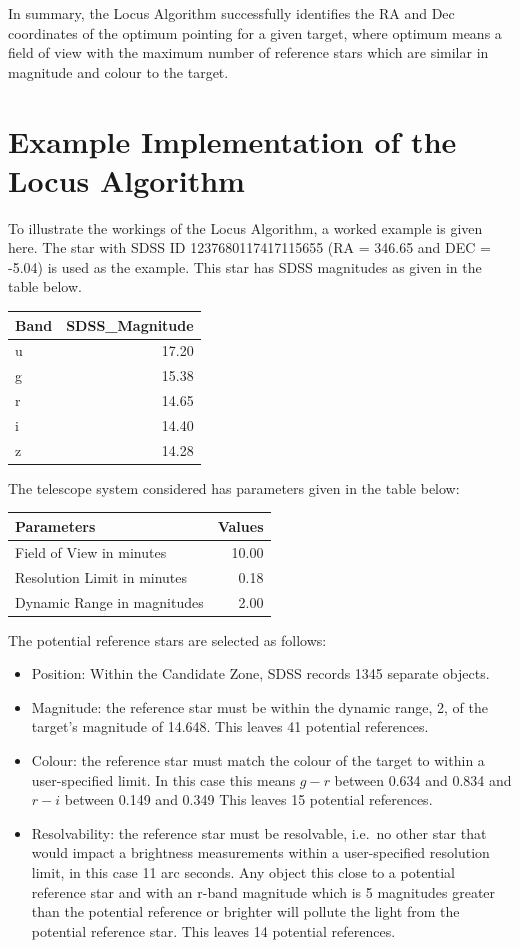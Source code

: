 \documentclass[]{elsarticle} %
\providecommand{\tightlist}{%
  \setlength{\itemsep}{0pt}\setlength{\parskip}{0pt}}
\begin{document}
In summary, the Locus Algorithm successfully identifies the RA and Dec
coordinates of the optimum pointing for a given target, where optimum
means a field of view with the maximum number of reference stars which
are similar in magnitude and colour to the target.

\newpage

\hypertarget{example-implementation-of-the-locus-algorithm}{%
\section{Example Implementation of the Locus
Algorithm}\label{example-implementation-of-the-locus-algorithm}}

To illustrate the workings of the Locus Algorithm, a worked example is
given here. The star with SDSS ID 1237680117417115655 (RA = 346.65 and
DEC = -5.04) is used as the example. This star has SDSS magnitudes as
given in the table below.

\begin{longtable}[]{@{}lr@{}}
\toprule
Band & SDSS\_Magnitude\tabularnewline
\midrule
\endhead
u & 17.20\tabularnewline
g & 15.38\tabularnewline
r & 14.65\tabularnewline
i & 14.40\tabularnewline
z & 14.28\tabularnewline
\bottomrule
\end{longtable}

The telescope system considered has parameters given in the table below:

\begin{longtable}[]{@{}lr@{}}
\toprule
Parameters & Values\tabularnewline
\midrule
\endhead
Field of View in minutes & 10.00\tabularnewline
Resolution Limit in minutes & 0.18\tabularnewline
Dynamic Range in magnitudes & 2.00\tabularnewline
\bottomrule
\end{longtable}

The potential reference stars are selected as follows:

\begin{itemize}
\tightlist
\item
  Position: Within the Candidate Zone, SDSS records 1345 separate
  objects.
\item
  Magnitude: the reference star must be within the dynamic range, 2, of
  the target's magnitude of 14.648. This leaves 41 potential references.
\item
  Colour: the reference star must match the colour of the target to
  within a user-specified limit. In this case this means \(g - r\)
  between 0.634 and 0.834 and \(r - i\) between 0.149 and 0.349 This
  leaves 15 potential references.
\item
  Resolvability: the reference star must be resolvable, i.e.~no other
  star that would impact a brightness measurements within a
  user-specified resolution limit, in this case 11 arc seconds. Any
  object this close to a potential reference star and with an r-band
  magnitude which is 5 magnitudes greater than the potential reference
  or brighter will pollute the light from the potential reference star.
  This leaves 14 potential references.
\end{itemize}
\end{document}
